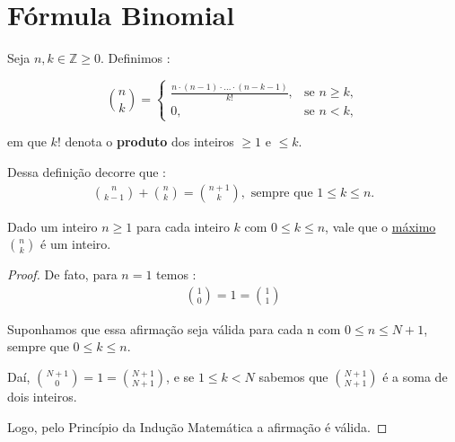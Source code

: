 \section{Fórmula Binomial}

    \begin{definicao}
        Seja $n,k \in \mathbb{Z} \ge 0$. Definimos :
        
       \begin{equation*}
            \binom{n}{k} = \begin{cases}\displaystyle
                \frac{n \cdot (n-1) \cdot \dotsc \cdot (n-k-1) }{k!}, & \text{se } n \ge k,\\[6pt] 
                0, & \text{se } n < k,
            \end{cases}        
        \end{equation*}

        \hspace{0.5cm} em que $k!$ denota o \textbf{produto} dos inteiros $\ge 1$ e $\leq k$.
        
    \end{definicao}

    Dessa definição decorre que :
    \begin{align*}
        \binom{n}{k-1} + \binom{n}{k} = \binom{n + 1}{k}, \text{ sempre que $1 \leq k \leq n$.}
    \end{align*}

    \begin{proposicao}
        Dado um inteiro $n \ge 1$ para cada inteiro $k$ com $0 \leq k \leq n$, vale que o \underline{máximo} $\binom{n}{k}$ é um inteiro.
        
        \begin{proof}
            De fato, para $n=1$ temos :
            \begin{align*}
                \binom{1}{0} = 1 = \binom{1}{1}
            \end{align*}

            Suponhamos que essa afirmação seja válida para cada n com $0 \leq n \leq N+1$, sempre que $0 \leq k \leq n$.

            Daí,
            $\binom{N+1}{0} = 1 = \binom{N+1}{N+1}$, e se $1 \leq k < N$ sabemos que $\binom{N+1}{N+1}$ é a soma de dois inteiros.

            Logo, pelo Princípio da Indução Matemática a afirmação é válida.
        \end{proof}
    
    \end{proposicao}

